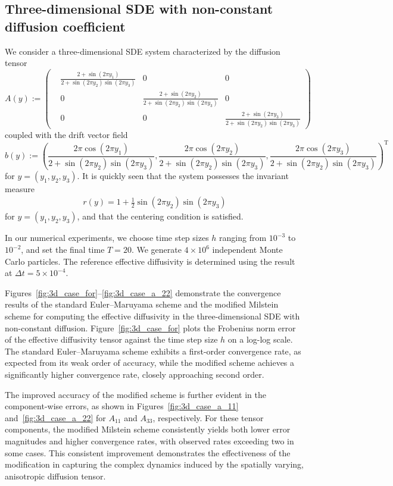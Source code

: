 \documentclass[12pt,a4paper,reqno]{amsart}
\numberwithin{equation}{section}
\begin{document}
\subsection{Three-dimensional SDE with non-constant diffusion coefficient}
We consider a three-dimensional SDE system characterized by the diffusion tensor 
$$A(y) :=
\begin{pmatrix}
&\frac{2 + \sin(2\pi y_1)}{2 + \sin(2\pi y_2)\sin(2\pi y_3)}  & 0 &0\\
&0 &\frac{2 + \sin(2\pi y_2)}{2 + \sin(2\pi y_2)\sin(2\pi y_3)} &0\\
&0 &0 &\frac{2 + \sin(2\pi y_3)}{2 + \sin(2\pi y_2)\sin(2\pi y_3)}
\end{pmatrix}
$$
coupled with the drift vector field
$$
b(y) := \left(\frac{2\pi \cos(2\pi y_1)}{ 2 + \sin(2\pi y_2)\sin(2\pi y_3)},\frac{2\pi \cos(2\pi y_2)}{ 2+\sin(2\pi y_2)\sin(2\pi y_3)},\frac{2\pi \cos(2\pi y_3)}{ 2+\sin(2\pi y_2)\sin(2\pi y_3)}\right)^{\mathrm{T}}
$$
for $y=(y_1,y_2,y_3)$. It is quickly seen that the system possesses the invariant measure 
\begin{align*}
    r(y) = 1 + \frac{1}{2}\sin (2\pi y_2)\sin(2\pi y_3)
\end{align*}
for $y=(y_1,y_2,y_3)$, and that the centering condition is satisfied.
 
 In our numerical experiments, we choose time step sizes $h$ ranging from $10^{-3}$ to $10^{-2}$, and set the final time $T = 20$. We generate $4\times10^6$ independent Monte Carlo particles. The reference effective diffusivity is determined using the result at $\Delta t = 5\times10^{-4}$. 
 
 Figures~\ref{fig:3d_case_for}--\ref{fig:3d_case_a_22} demonstrate the convergence results of the standard Euler--Maruyama scheme and the modified Milstein scheme for computing the effective diffusivity in the three-dimensional SDE with non-constant diffusion. Figure~\ref{fig:3d_case_for}
 plots the Frobenius norm error of the effective diffusivity tensor against the time step size $h$ on a log-log scale. The standard Euler--Maruyama scheme exhibits a first-order convergence rate, as expected from its weak order of accuracy, while the modified scheme achieves a significantly higher convergence rate, closely approaching second order.

The improved accuracy of the modified scheme is further evident in the component-wise errors, as shown in Figures~\ref{fig:3d_case_a_11} and~\ref{fig:3d_case_a_22} for $A_{11}$ and $A_{33}$, respectively. For these tensor components, the modified Milstein scheme consistently yields both lower error magnitudes and higher convergence rates, with observed rates exceeding two in some cases. This consistent improvement demonstrates the effectiveness of the modification in capturing the complex dynamics induced by the spatially varying, anisotropic diffusion tensor.
\end{document}
